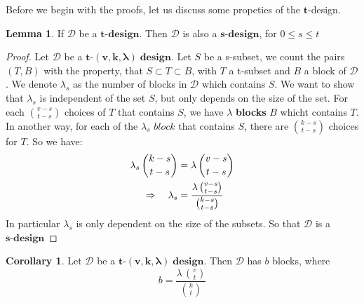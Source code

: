 \documentclass[12pt]{article}
\theoremstyle{definition}
\newtheorem{lemma}[theorem]{Lemma}
\newtheorem{collary}[theorem]{Corollary}
\numberwithin{equation}{theorem}
\numberwithin{figure}{theorem}
\newcommand{\tCompleteDesign}{\ensuremath{\bm{t\mbox{-}(v,k,\lambda)\; design}}}
\newcommand{\myBlock}{{block}}
\newcommand{\pluralMyBlock}{\textbf{blocks}}
\newcommand{\xDesign}[1]{\ensuremath{\bm{#1\mbox{-}design}}}
\newcommand{\dDes}{\ensuremath{\mathcal{D}}}
\begin{document}
Before we begin with the proofs, let us discuss some propeties of the $\bm{t}$-design.
\begin{lemma}\label{propTdesign}
If {\dDes} be a $\bm{t\mbox{-}design}$. Then {\dDes} is also a $\bm{s\mbox{-}design}$, for $0 \leq s \leq t$
\end{lemma}
\begin{proof}
Let {\dDes} be a \tCompleteDesign.
Let $S$ be a s-subset, we count the pairs $(T,B)$ with the property, that $S \subset T \subset B$, with $T$ a t-subset and $B$ a block of {\dDes}. We denote $\lambda_s$ as the number of blocks in {\dDes} which contains $S$. We want to show that $\lambda_s$ is independent of the set $S$, but only depends on the size of the set. 
For each $\binom{v-s}{t-s}$ choices of $T$ that contains $S$, we have $\lambda$ {\pluralMyBlock} $B$ whicht contains $T$. In another way, for each of the $\lambda_s$ $\myBlock$ that contains $S$, there are $\binom{k-s}{t-s}$ choices for $T$. So we have:
\begin{align}
	\lambda_s \, \binom{k-s}{t-s} &= \lambda \, \binom{v-s}{t-s} \notag\\
	\Rightarrow  \quad \lambda_s &= \frac{\lambda \, \binom{v-s}{t-s}}{\binom{k-s}{t-s}} \label{sDesign}
\end{align}
In particular $\lambda_s$ is only dependent on the size of the subsets. So that {\dDes} is a \xDesign{s}
\end{proof}

\begin{collary}\label{blockCount}
Let {\dDes} be a \tCompleteDesign.
Then {\dDes} has $b$ blocks, where
\[
	b = \frac{\lambda \, \binom{v}{t}}{\binom{k}{t}}
\]
\end{collary}
\end{document}
